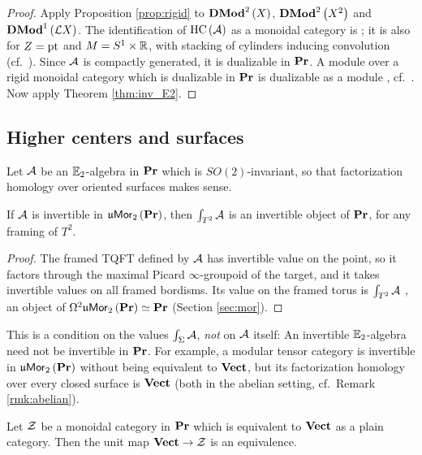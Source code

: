 \begin{proof}
Apply Proposition \ref{prop:rigid} to $\mathbf{DMod}^2\left(X\right)$, $\mathbf{DMod}^2\left(X^2\right)$ and
$\mathbf{DMod}^1\left(\mathcal{L} X\right)$. The identification of
$\operatorname{HC}\left(\mathcal{A}\right)$ as a monoidal category is \cite[Corollary 5.2]{Ber:Sph}; it is also
\cite[Theorem 3.3.1]{HoLi} for $Z=\text{pt}$ and $M=S^1\times\mathbb{R}$, with stacking of cylinders
inducing convolution (cf.\ \cite[Example 1.3.8]{HoLi}).
Since $\mathcal{A}$ is compactly generated, it is dualizable in $\mathbf{Pr}$. A module over a rigid
monoidal category which is dualizable in $\mathbf{Pr}$ is dualizable as a module
\cite[Proposition 2.1.6]{Ber:ShvCatH}, cf.\ \cite[Chapter 1, Section 9]{GR:v1}. Now apply Theorem \ref{thm:inv_E2}.
\end{proof}

\subsection{Higher centers and surfaces}
\label{sec:DMod_centers}

Let $\mathcal{A}$ be an $\mathbb{E}_2$-algebra in $\mathbf{Pr}$ which is $SO\left(2\right)$-invariant, so that
factorization homology over oriented surfaces makes sense.

\begin{lem}
\label{lem:inv_surfaces}
If $\mathcal{A}$ is invertible in $\mathfrak{u}\mathsf{Mor}_2\left(\mathbf{Pr}\right)$, then $\int_{T^2}\mathcal{A}$ is an invertible
object of $\mathbf{Pr}$, for any framing of $T^2$.
\end{lem}

\begin{proof}
The framed TQFT defined by $\mathcal{A}$ has invertible value on the point, so it factors through the
maximal Picard $\infty$-groupoid of the target, and it takes invertible values on all framed
bordisms.
Its value on the framed torus is $\int_{T^2}\mathcal{A}$ \cite{Sch:thesis}, an object of
$\Omega^2\mathfrak{u}\mathsf{Mor}_2\left(\mathbf{Pr}\right)\simeq\mathbf{Pr}$ (Section \ref{sec:mor}).
\end{proof}

This is a condition on the values $\int_\Sigma\mathcal{A}$, \emph{not} on $\mathcal{A}$ itself: An invertible
$\mathbb{E}_2$-algebra need not be invertible in $\mathbf{Pr}$. For example, a modular tensor category is
invertible in $\mathfrak{u}\mathsf{Mor}_2\left(\mathbf{Pr}\right)$ \cite{BJSS} without being equivalent to $\mathbf{Vect}$, but its
factorization homology over every closed surface is $\mathbf{Vect}$ \cite[Theorem 9.7]{KT:4d}
(both in the abelian setting, cf.\ Remark \ref{rmk:abelian}).

\begin{lem}
\label{lem:unit_Vect}
Let $\mathcal{Z}$ be a monoidal category in $\mathbf{Pr}$ which is equivalent to $\mathbf{Vect}$ as a plain
category. Then the unit map $\mathbf{Vect}\to\mathcal{Z}$ is an equivalence.
\end{lem}

